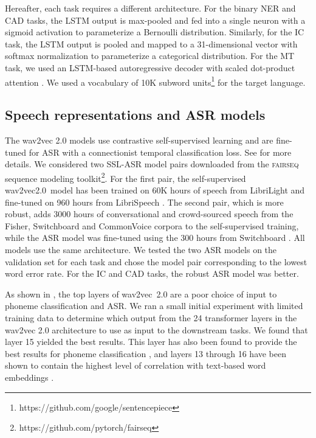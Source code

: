 \documentclass{article}
\begin{document}
Hereafter, each task requires a different architecture. For the binary NER and CAD tasks, the LSTM output  is max-pooled and fed into a single neuron with a sigmoid activation to parameterize a Bernoulli distribution. Similarly, for the IC task, the LSTM output is pooled and mapped to a 31-dimensional vector with softmax normalization to parameterize a categorical distribution. For the MT task, we used an LSTM-based autoregressive decoder with scaled dot-product attention \cite{vaswani2017attention}. We used a vocabulary of 10K subword units\footnote{https://github.com/google/sentencepiece} for the target language.


\subsection{Speech representations and ASR models}
\label{sec:speech_asr}
The wav2vec 2.0 models use contrastive self-supervised learning and are fine-tuned for ASR with a connectionist temporal classification loss. See \cite{baevski2020wav2vec} for more details. We considered two SSL-ASR model pairs downloaded from the \textsc{fairseq} sequence modeling toolkit\footnote{https://github.com/pytorch/fairseq}. For the first pair, the self-supervised wav2vec2.0~model has been trained on 60K hours of speech from LibriLight and fine-tuned on 960 hours from LibriSpeech \cite{baevski2020wav2vec}. The second pair, which is more robust, adds 3000 hours of conversational and crowd-sourced speech from the Fisher, Switchboard and CommonVoice corpora to the self-supervised training, while the ASR model was fine-tuned using the 300 hours from Switchboard \cite{hsu2021robust}. All models use the same architecture. We tested the two ASR models on the validation set for each task and chose the model pair corresponding to the lowest word error rate. For the IC and CAD tasks, the robust ASR model was better. 



As shown in \cite{baevski2021unsupervised, borgholt2021scaling}, the top layers of wav2vec~2.0 are a poor choice of input to phoneme classification and ASR. We ran a small initial experiment with limited training data to determine which output from the 24 transformer layers in the wav2vec 2.0 architecture to use as input to the downstream tasks. We found that layer 15 yielded the best results. 
This layer has also been found to provide the best results for phoneme classification \cite{baevski2021unsupervised}, and layers 13 through 16 have been shown to contain the highest level of correlation with text-based word embeddings \cite{pasad2021layer}.
\end{document}
